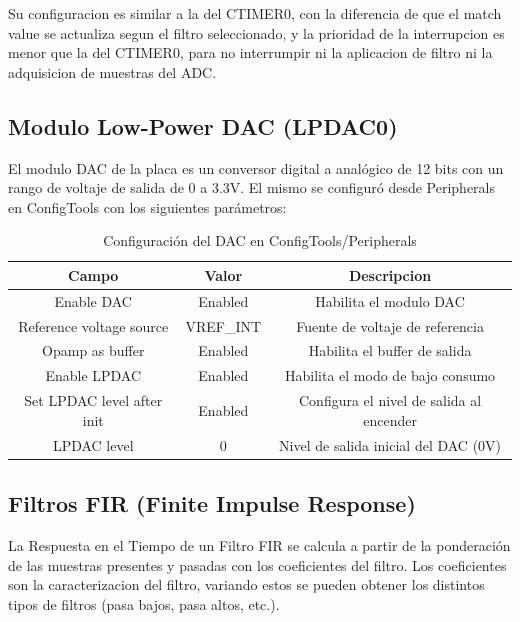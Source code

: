 \documentclass[11pt,a4paper]{article}
\begin{document}
Su configuracion es similar a la del CTIMER0, con la diferencia de que el match
value se actualiza segun el filtro seleccionado, y la prioridad de la
interrupcion es menor que la del CTIMER0, para no interrumpir ni la aplicacion
de filtro ni la adquisicion de muestras del ADC.\@

\subsection{Modulo Low-Power DAC (LPDAC0)}

El modulo DAC de la placa es un conversor digital a analógico de 12 bits con un
rango de voltaje de salida de 0 a 3.3V. El mismo se configuró desde Peripherals
en ConfigTools con los siguientes parámetros:

\begin{table}[H]
    \centering
    \begin{tabular}{|c|c|c|}
        \hline
        \textbf{Campo}             & \textbf{Valor} & \textbf{Descripcion}                     \\
        \hline
        Enable DAC                 & Enabled        & Habilita el modulo DAC                   \\
        Reference voltage source   & VREF\_INT      & Fuente de voltaje de referencia          \\
        Opamp as buffer            & Enabled        & Habilita el buffer de salida             \\
        Enable LPDAC               & Enabled        & Habilita el modo de bajo consumo         \\
        Set LPDAC level after init & Enabled        & Configura el nivel de salida al encender \\
        LPDAC level                & 0              & Nivel de salida inicial del DAC (0V)     \\
        \hline
    \end{tabular}
    \caption{Configuración del DAC en ConfigTools/Peripherals}
\end{table}

\subsection{Filtros FIR (Finite Impulse Response)}

La Respuesta en el Tiempo de un Filtro FIR se calcula a partir de la
ponderación de las muestras presentes y pasadas con los coeficientes del
filtro. Los coeficientes son la caracterizacion del filtro, variando estos se
pueden obtener los distintos tipos de filtros (pasa bajos, pasa altos, etc.).
\end{document}
